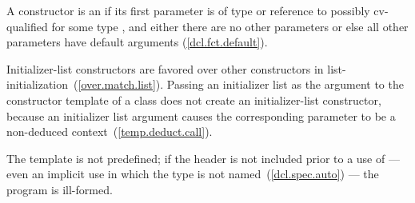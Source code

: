 \pnum
A constructor is an  if its first parameter is
of type  or reference to possibly cv-qualified
 for some type , and either there are no other
parameters or else all other parameters have default arguments (\ref{dcl.fct.default}).
\begin{note} Initializer-list constructors are favored over other constructors in
list-initialization~(\ref{over.match.list}). Passing an initializer list as the argument
to the constructor template  of a class  does not
create an initializer-list constructor, because an initializer list argument causes the
corresponding parameter to be a non-deduced context~(\ref{temp.deduct.call}). \end{note}
The template
 is not predefined; if the header
 is not included prior to a use of
 --- even an implicit use in which the type is not
named~(\ref{dcl.spec.auto}) --- the program is ill-formed.


